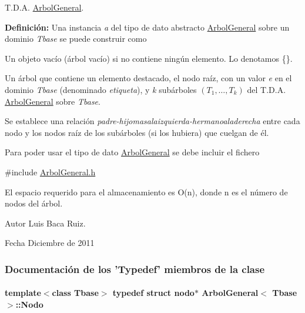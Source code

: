 T.\-D.\-A. \hyperlink{classArbolGeneral}{Arbol\-General}. 

{\bfseries Definición\-:} Una instancia {\itshape a} del tipo de dato abstracto \hyperlink{classArbolGeneral}{Arbol\-General} sobre un dominio {\itshape Tbase} se puede construir como


\begin{DoxyItemize}
\item Un objeto vacío (árbol vacío) si no contiene ningún elemento. Lo denotamos \{\}.
\item Un árbol que contiene un elemento destacado, el nodo raíz, con un valor {\itshape e} en el dominio {\itshape Tbase} (denominado {\itshape etiqueta}), y {\itshape k} subárboles $(T_1, \ldots, T_k)$ del T.\-D.\-A. \hyperlink{classArbolGeneral}{Arbol\-General} sobre {\itshape Tbase}.
\end{DoxyItemize}

Se establece una relación {\itshape padre-\/hijomasalaizquierda-\/hermanoaladerecha} entre cada nodo y los nodos raíz de los subárboles (si los hubiera) que cuelgan de él.

Para poder usar el tipo de dato \hyperlink{classArbolGeneral}{Arbol\-General} se debe incluir el fichero

{\ttfamily \#include \hyperlink{ArbolGeneral_8h}{Arbol\-General.\-h}}

El espacio requerido para el almacenamiento es O(n), donde n es el número de nodos del árbol.

\begin{DoxyAuthor}{Autor}
Luis Baca Ruiz. 
\end{DoxyAuthor}
\begin{DoxyDate}{Fecha}
Diciembre de 2011 
\end{DoxyDate}


\subsubsection{Documentación de los 'Typedef' miembros de la clase}
\hypertarget{classArbolGeneral_a12cc1b74a9095d89bc7334290d332f7a}{
\paragraph[{Nodo}]{\setlength{\rightskip}{0pt plus 5cm}template$<$class Tbase$>$ typedef struct {\bf nodo}$\ast$ {\bf Arbol\-General}$<$ Tbase $>$\-::{\bf Nodo}}}\label{classArbolGeneral_a12cc1b74a9095d89bc7334290d332f7a}


